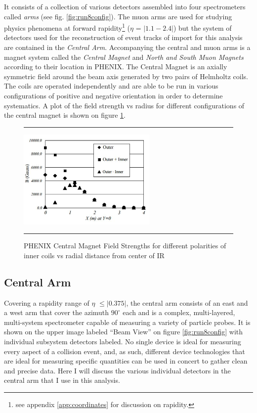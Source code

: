 It consists of a collection of various detectors assembled into four spectrometers called \textit{arms} (see fig. \ref{fig:run8config}). The muon arms are used for studying physics phenomena at forward rapidity\footnote{see appendix \ref{app:coordinates} for discussion on rapidity.} ($\eta$ = $|1.1-2.4|$)\citep{rapidityref} but the system of detectors used for the reconstruction of event tracks of import for this analysis are contained in the \textit{Central Arm}. Accompanying the central and muon arms is a magnet system called the \textit{Central Magnet} and \textit{North and South Muon Magnets} according to their location in PHENIX. The Central Magnet is an axially symmetric field around the beam axis generated by two pairs of Helmholtz coils. The coils are operated independently and are able to be run in various configurations of positive and negative orientation in order to determine systematics\citep{rolnickthesis}. A plot of the field strength vs radius for different configurations of the central magnet is shown on figure \ref{fig:centralmagnet}.

\begin{figure}[htbp]
  \centering
    \rule{35em}{0.5pt}
    \includegraphics[width=0.6\textwidth]{Figures/phenixcentralmagnet.JPG}
  \caption[PHENIX Central Magnet Field Strengths.]{PHENIX Central Magnet Field Strengths for different polarities of inner coils vs radial distance from center of IR}
  \label{fig:centralmagnet}
    \rule{35em}{0.5pt}
\end{figure}
\subsection{Central Arm}
Covering a rapidity range of $\eta$ $\leq|0.375|$, the central arm consists of an east and a west arm that cover the azimuth $90^{\circ}$ each\citep{EMCfocus} and is a complex, multi-layered, multi-system spectrometer capable of measuring a variety of particle probes. It is shown on the upper image labeled ``Beam View'' on figure \ref{fig:run8config} with individual subsystem detectors labeled. No single device is ideal for measuring every aspect of a collision event, and, as such, different device technologies that are ideal for measuring specific quantities can be used in concert to gather clean and precise data. Here I will discuss the various individual detectors in the central arm that I use in this analysis.

